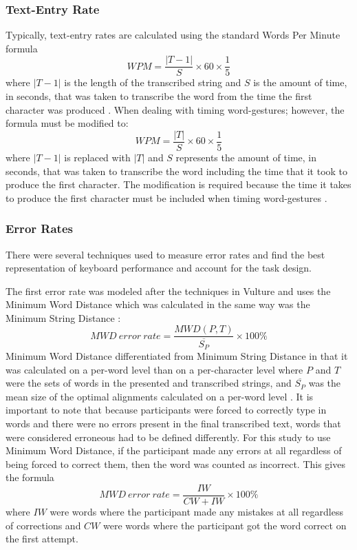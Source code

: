 \subsubsection{Text-Entry Rate}
Typically, text-entry rates are calculated using the standard Words Per Minute formula
\begin{equation}
WPM = \frac{|T-1|}{S} \times 60 \times \frac{1}{5}
\end{equation}
where $|T-1|$ is the length of the transcribed string and $S$ is the amount of time, in seconds, that was taken to transcribe the word from the time the first character was produced \cite{ref_wpm_word_gesture_formula}. When dealing with timing word-gestures; however, the formula must be modified to:
\begin{equation} \label{WPM}
WPM = \frac{|T|}{S} \times 60 \times \frac{1}{5}
\end{equation}
where $|T-1|$ is replaced with $|T|$ and $S$ represents the amount of time, in seconds, that was taken to transcribe the word including the time that it took to produce the first character. The modification is required because the time it takes to produce the first character must be included when timing word-gestures \cite{ref_wpm_word_gesture_timing}.

\subsubsection{Error Rates}
There were several techniques used to measure error rates and find the best representation of keyboard performance and account for the task design.

The first error rate was modeled after the techniques in Vulture \cite{ref_vulture} and uses the Minimum Word Distance which was calculated in the same way was the Minimum String Distance \cite{ref_error_rates,ref_vulture_MSD_ref}:
\begin{equation} \label{MWD}
MWD\ error\ rate = \frac{MWD(P,T)}{\overline{S_P}} \times 100\%
\end{equation}
Minimum Word Distance differentiated from Minimum String Distance in that it was calculated on a per-word level than on a per-character level where $P$ and $T$ were the sets of words in the presented and transcribed strings, and $\overline{S_P}$ was the mean size of the optimal alignments calculated on a per-word level \cite{ref_vulture}. It is important to note that because participants were forced to correctly type in words and there were no errors present in the final transcribed text, words that were considered erroneous had to be defined differently. For this study to use Minimum Word Distance, if the participant made any errors at all regardless of being forced to correct them, then the word was counted as incorrect. This gives the formula
\begin{equation} \label{MWD_simple}
MWD\ error\ rate = \frac{IW}{CW + IW} \times 100\%
\end{equation}
where $IW$ were words where the participant made any mistakes at all regardless of corrections and $CW$ were words where the participant got the word correct on the first attempt.

